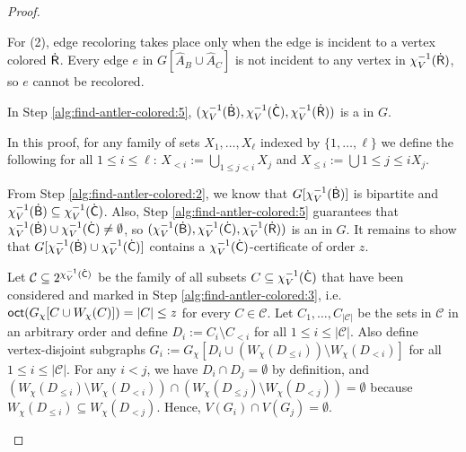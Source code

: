 \begin{proof}
\begin{claimproof}
      For (2), edge recoloring takes place only when the edge is incident to a vertex colored $\mathsf{\dot{R}}$.
      Every edge $e$ in $G[\hat{A}_B \cup \hat{A}_C]$ is not incident to
      any vertex in $\chi_V^{-1}(\mathsf{\dot{R}})$, so $e$ cannot be recolored.
  \end{claimproof}

  \begin{claim}\label{clm:find-antler-colored-output}
      In Step \ref{alg:find-antler-colored:5}, $(\chi_V^{-1}(\mathsf{\dot{B}}), \chi_V^{-1}(\mathsf{\dot{C}}), \chi_V^{-1}(\mathsf{\dot{R}}))$ is a \zocc in $G$.
  \end{claim}
  \begin{claimproof}
      In this proof, for any family of sets $X_1,\ldots,X_\ell$ indexed by $\{1,\ldots,\ell\}$
      we define the following for all $1 \leq i \leq \ell$:
      $X_{<i} := \bigcup_{1 \leq j < i}X_j$ and $X_{\leq i} := \bigcup{1 \leq j \leq i}X_j$.

      From Step \ref{alg:find-antler-colored:2}, we know that $G[\chi_V^{-1}(\mathsf{\dot{B}})]$ is bipartite
      and $\chi_V^{-1}(\mathsf{\dot{B}}) \subseteq \chi_V^{-1}(\mathsf{\dot{C}})$.
      Also, Step \ref{alg:find-antler-colored:5} guarantees that $\chi_V^{-1}(\mathsf{\dot{B}}) \cup \chi_V^{-1}(\mathsf{\dot{C}}) \neq \emptyset$, so $(\chi_V^{-1}(\mathsf{\dot{B}}), \chi_V^{-1}(\mathsf{\dot{C}}), \chi_V^{-1}(\mathsf{\dot{R}}))$ is an \occ in $G$.
      It remains to show that $G[\chi_V^{-1}(\mathsf{\dot{B}}) \cup \chi_V^{-1}(\mathsf{\dot{C}})]$ contains a $\chi_V^{-1}(\mathsf{\dot{C}})$-certificate of order $z$.

      Let $\mathcal{C} \subseteq 2^{\chi_V^{-1}(\mathsf{\dot{C}})}$ be the family of all subsets $C \subseteq \chi_V^{-1}(\mathsf{\dot{C}})$ that have been considered and marked in Step \ref{alg:find-antler-colored:3}, i.e. $\textnormal{\textsf{oct}}(G_\chi[C \cup W_\chi(C)]) = |C| \leq z$ for every $C \in \mathcal{C}$.
      Let $C_1,\ldots,C_{|\mathcal{C}|}$ be the sets in $\mathcal{C}$ in an arbitrary order
      and define $D_i := C_i \setminus C_{<i}$ for all $1 \leq i \leq |\mathcal{C}|$.
      Also define vertex-disjoint subgraphs $G_i := G_\chi[D_i \cup (W_\chi(D_{\leq i})) \setminus W_\chi(D_{<i})]$ for all $1 \leq i \leq |\mathcal{C}|$.
      For any $i<j$, we have $D_i \cap D_j = \emptyset$ by definition, and 
      $(W_\chi(D_{\leq i}) \setminus W_\chi(D_{<i})) \cap (W_\chi(D_{\leq j}) \setminus W_\chi(D_{<j})) = \emptyset$ because $W_\chi(D_{\leq i}) \subseteq W_\chi(D_{<j})$.
      Hence, $V(G_i) \cap V(G_j) = \emptyset$.


\end{claimproof}
\end{proof}
